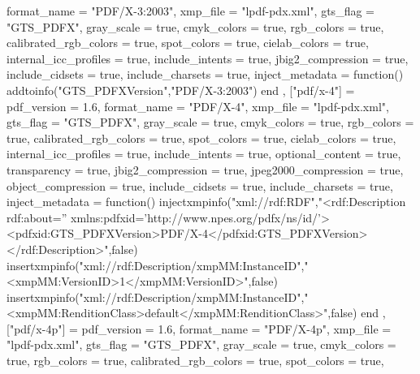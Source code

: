 {{            format_name             = "PDF/X-3:2003",
            xmp_file                = "lpdf-pdx.xml",
            gts_flag                = "GTS_PDFX",
            gray_scale              = true,
            cmyk_colors             = true,
            rgb_colors              = true,
            calibrated_rgb_colors   = true,
            spot_colors             = true,
            cielab_colors           = true,
            internal_icc_profiles   = true,
            include_intents         = true,
            jbig2_compression       = true,
            include_cidsets         = true,
            include_charsets        = true,
            inject_metadata         = function()
                addtoinfo("GTS_PDFXVersion","PDF/X-3:2003")
            end
        },
        ["pdf/x-4"] = 
        {
            pdf_version             = 1.6,
            format_name             = "PDF/X-4",
            xmp_file                = "lpdf-pdx.xml",
            gts_flag                = "GTS_PDFX",
            gray_scale              = true,
            cmyk_colors             = true,
            rgb_colors              = true,
            calibrated_rgb_colors   = true,
            spot_colors             = true,
            cielab_colors           = true,
            internal_icc_profiles   = true,
            include_intents         = true,
            optional_content        = true,
            transparency            = true,
            jbig2_compression       = true,
            jpeg2000_compression    = true,
            object_compression      = true,
            include_cidsets         = true,
            include_charsets        = true,
            inject_metadata         = function()
                injectxmpinfo("xml://rdf:RDF","<rdf:Description rdf:about='' xmlns:pdfxid='http://www.npes.org/pdfx/ns/id/'><pdfxid:GTS_PDFXVersion>PDF/X-4</pdfxid:GTS_PDFXVersion></rdf:Description>",false)
                insertxmpinfo("xml://rdf:Description/xmpMM:InstanceID","<xmpMM:VersionID>1</xmpMM:VersionID>",false)
                insertxmpinfo("xml://rdf:Description/xmpMM:InstanceID","<xmpMM:RenditionClass>default</xmpMM:RenditionClass>",false)
            end
        },
        ["pdf/x-4p"] = {
            pdf_version             = 1.6,
            format_name             = "PDF/X-4p",
            xmp_file                = "lpdf-pdx.xml",
            gts_flag                = "GTS_PDFX",
            gray_scale              = true,
            cmyk_colors             = true,
            rgb_colors              = true,
            calibrated_rgb_colors   = true,
            spot_colors             = true,
}}
